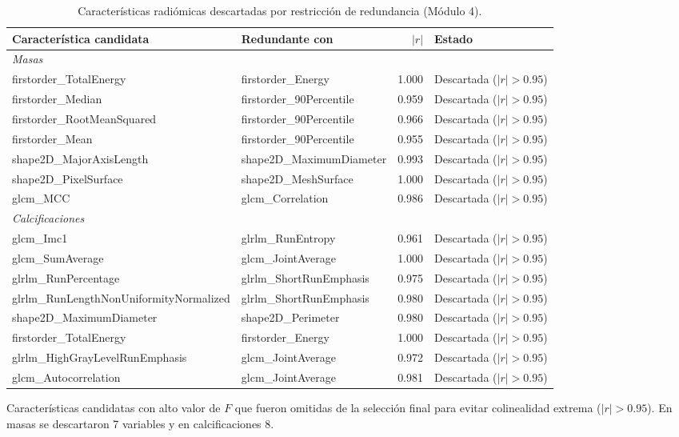 \begin{table}[H]
\centering
\small
\caption{Características radiómicas descartadas por restricción de redundancia (Módulo 4).}
\label{tab:anexo_m4_redundancia}
\begin{adjustbox}{max width=\linewidth}
\begin{tabular}{l l r l}
\toprule
Característica candidata & Redundante con & $|r|$ & Estado \\
\midrule
\multicolumn{4}{l}{\textit{Masas}} \\
\quad firstorder\_TotalEnergy & firstorder\_Energy & 1.000 & Descartada ($|r| > 0.95$) \\
\quad firstorder\_Median & firstorder\_90Percentile & 0.959 & Descartada ($|r| > 0.95$) \\
\quad firstorder\_RootMeanSquared & firstorder\_90Percentile & 0.966 & Descartada ($|r| > 0.95$) \\
\quad firstorder\_Mean & firstorder\_90Percentile & 0.955 & Descartada ($|r| > 0.95$) \\
\quad shape2D\_MajorAxisLength & shape2D\_MaximumDiameter & 0.993 & Descartada ($|r| > 0.95$) \\
\quad shape2D\_PixelSurface & shape2D\_MeshSurface & 1.000 & Descartada ($|r| > 0.95$) \\
\quad glcm\_MCC & glcm\_Correlation & 0.986 & Descartada ($|r| > 0.95$) \\
\multicolumn{4}{l}{\textit{Calcificaciones}} \\
\quad glcm\_Imc1 & glrlm\_RunEntropy & 0.961 & Descartada ($|r| > 0.95$) \\
\quad glcm\_SumAverage & glcm\_JointAverage & 1.000 & Descartada ($|r| > 0.95$) \\
\quad glrlm\_RunPercentage & glrlm\_ShortRunEmphasis & 0.975 & Descartada ($|r| > 0.95$) \\
\quad glrlm\_RunLengthNonUniformityNormalized & glrlm\_ShortRunEmphasis & 0.980 & Descartada ($|r| > 0.95$) \\
\quad shape2D\_MaximumDiameter & shape2D\_Perimeter & 0.980 & Descartada ($|r| > 0.95$) \\
\quad firstorder\_TotalEnergy & firstorder\_Energy & 1.000 & Descartada ($|r| > 0.95$) \\
\quad glrlm\_HighGrayLevelRunEmphasis & glcm\_JointAverage & 0.972 & Descartada ($|r| > 0.95$) \\
\quad glcm\_Autocorrelation & glcm\_JointAverage & 0.981 & Descartada ($|r| > 0.95$) \\
\bottomrule
\end{tabular}
\end{adjustbox}
\par\smallskip
\parbox{0.95\linewidth}{\footnotesize Características candidatas con alto valor de $F$ que fueron omitidas de la selección final para evitar colinealidad extrema ($|r| > 0.95$). En masas se descartaron 7 variables y en calcificaciones 8.}
\end{table}
